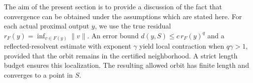 \documentclass{article}
\begin{document}
The aim of the present section is to provide a discussion of the fact that convergence can be obtained under the assumptions which are stated here.
For each actual proximal output $y$, we use the true residual $r_F(y)=\inf_{v\in F(y)}\|v\|$.
An error bound $d(y,S)\le c\,r_F(y)^q$ and a reflected-resolvent estimate with exponent $\gamma$ yield local contraction when $q\gamma>1$, provided that the orbit remains in the certified neighborhood.
A strict length budget ensures this localization. The resulting allowed orbit has finite length and converges to a point in $S$.
\end{document}
